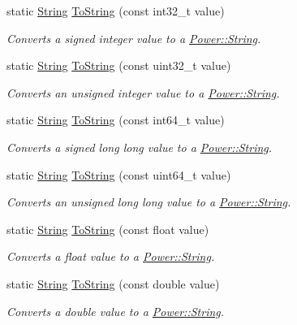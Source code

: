 \begin{DoxyCompactItemize}
static \hyperlink{class_power_1_1_string}{String} \hyperlink{class_power_1_1_string_af88609c608f5996fb997553e5f141bc6}{To\+String} (const int32\+\_\+t value)
\begin{DoxyCompactList}\small\item\em Converts a signed integer value to a \hyperlink{class_power_1_1_string}{Power\+::\+String}. \end{DoxyCompactList}\item 
static \hyperlink{class_power_1_1_string}{String} \hyperlink{class_power_1_1_string_adc77cae195a8cf75e8353f2c3f1e3893}{To\+String} (const uint32\+\_\+t value)
\begin{DoxyCompactList}\small\item\em Converts an unsigned integer value to a \hyperlink{class_power_1_1_string}{Power\+::\+String}. \end{DoxyCompactList}\item 
static \hyperlink{class_power_1_1_string}{String} \hyperlink{class_power_1_1_string_a5d8819bfc6a4877b59bd6782c5e75796}{To\+String} (const int64\+\_\+t value)
\begin{DoxyCompactList}\small\item\em Converts a signed long long value to a \hyperlink{class_power_1_1_string}{Power\+::\+String}. \end{DoxyCompactList}\item 
static \hyperlink{class_power_1_1_string}{String} \hyperlink{class_power_1_1_string_a986108efc696a9791ae48e7b6d71557c}{To\+String} (const uint64\+\_\+t value)
\begin{DoxyCompactList}\small\item\em Converts an unsigned long long value to a \hyperlink{class_power_1_1_string}{Power\+::\+String}. \end{DoxyCompactList}\item 
static \hyperlink{class_power_1_1_string}{String} \hyperlink{class_power_1_1_string_aa9619926b7b1b5011b77cb164b232f61}{To\+String} (const float value)
\begin{DoxyCompactList}\small\item\em Converts a float value to a \hyperlink{class_power_1_1_string}{Power\+::\+String}. \end{DoxyCompactList}\item 
static \hyperlink{class_power_1_1_string}{String} \hyperlink{class_power_1_1_string_a00829800eb265360178fd8af3186ebaf}{To\+String} (const double value)
\begin{DoxyCompactList}\small\item\em Converts a double value to a \hyperlink{class_power_1_1_string}{Power\+::\+String}. \end{DoxyCompactList}\item 

\end{DoxyCompactItemize}
